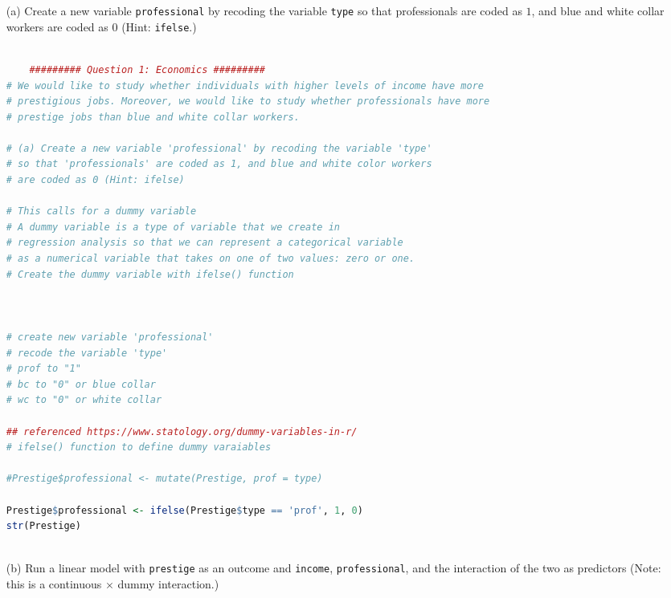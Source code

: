 \documentclass[12pt,letterpaper]{article}
\begin{document}
\newpage
\begin{enumerate}
	
	\item [(a)]
	Create a new variable \texttt{professional} by recoding the variable \texttt{type} so that professionals are coded as $1$, and blue and white collar workers are coded as $0$ (Hint: \texttt{ifelse}.)
	
	\vspace{2cm}
	
	
	\begin{lstlisting}[language=R]
	
	######### Question 1: Economics #########
# We would like to study whether individuals with higher levels of income have more
# prestigious jobs. Moreover, we would like to study whether professionals have more
# prestige jobs than blue and white collar workers. 

# (a) Create a new variable 'professional' by recoding the variable 'type'
# so that 'professionals' are coded as 1, and blue and white color workers
# are coded as 0 (Hint: ifelse)

# This calls for a dummy variable
# A dummy variable is a type of variable that we create in 
# regression analysis so that we can represent a categorical variable 
# as a numerical variable that takes on one of two values: zero or one.
# Create the dummy variable with ifelse() function



# create new variable 'professional'
# recode the variable 'type'
# prof to "1"
# bc to "0" or blue collar
# wc to "0" or white collar

## referenced https://www.statology.org/dummy-variables-in-r/
# ifelse() function to define dummy varaiables

#Prestige$professional <- mutate(Prestige, prof = type)

Prestige$professional <- ifelse(Prestige$type == 'prof', 1, 0)
str(Prestige)
	
	\end{lstlisting}
	
	
	\item [(b)]
	Run a linear model with \texttt{prestige} as an outcome and \texttt{income}, \texttt{professional}, and the interaction of the two as predictors (Note: this is a continuous $\times$ dummy interaction.)
	
	\vspace{2cm}
	
	\begin{lstlisting}[language=R]
	

\end{lstlisting}
\end{enumerate}
\end{document}
